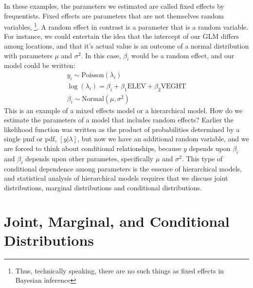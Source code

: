 In these examples, the parameters we estimated are called fixed
effects by frequentists. Fixed effects are parameters that are not
themselves random variables,
\footnote{Thus, technically speaking, there are no such
  things as fixed effects in Bayesian inference}. A random effect in
contrast is a parameter that is a random variable. For instance,
we could entertain the idea that the intercept of our GLM differs
among locations, and that it's actual value is an outcome of a normal
distribution with parameters $\mu$ and $\sigma^2$. In this case,
$\beta_i$ would be a random effect, and our model could be written:
\begin{gather}
y_i \sim \text{Poisson}(\lambda_i) \\
\log(\lambda_i) = \beta_i + \beta_1\text{ELEV} + \beta_2\text{VEGHT} \\
\beta_i \sim \text{Normal}(\mu, \sigma^2)
\end{gather}
This is an example of a mixed effects model or a hierarchical
model. How do we estimate the parameters of a model that includes
random effects? Earlier the likelihood function was written as the
product of probabilities determined by a single pmf or pdf,
$[y|\lambda]$, but now we have an additional random variable, and we
are forced to think about conditional relationships, because $y$
depends upon $\beta_i$ and $\beta_i$ depends upon other parametes,
specifically $\mu$ and $\sigma^2$.
This type of conditional dependence among parameters is the essence of hierarchical
models, and statistical analysis of hierarchical models requires that
we discuss joint distributions, marginal distributions and conditional
distributions.









\section{Joint, Marginal, and Conditional Distributions}

